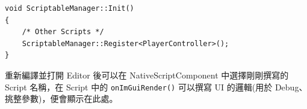 \begin{lstlisting}
void ScriptableManager::Init()
{
    /* Other Scripts */
    ScriptableManager::Register<PlayerController>();
}   
\end{lstlisting}

重新編譯並打開 Editor 後可以在 NativeScriptComponent 中選擇剛剛撰寫的 Script 名稱，在 Script 中的 \lstinline{onImGuiRender()} 可以撰寫 UI 的邏輯(用於 Debug、挑整參數)，便會顯示在此處。


